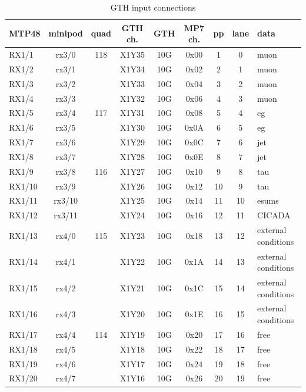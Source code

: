 \begin{longtable}{|l|c|c|c|c|c|c|c|l|}
\caption{GTH input connections}
    \label{tab:app:gth_i_conn}\\
\hline
\textbf{MTP48}& \textbf{minipod}& \textbf{quad}& \textbf{GTH ch.}& \textbf{GTH}& \textbf{MP7 ch.} &\textbf{pp}& \textbf{lane}& \textbf{data}\\
\hline
\hline
\endhead
RX1/1  & rx3/0  & 118 & X1Y35 & 10G & 0x00 & 1  & 0  & muon\\\hline
RX1/2  & rx3/1  &     & X1Y34 & 10G & 0x02 & 2  & 1  & muon\\\hline
RX1/3  & rx3/2  &     & X1Y33 & 10G & 0x04 & 3  & 2  & muon\\\hline
RX1/4  & rx3/3  &     & X1Y32 & 10G & 0x06 & 4  & 3  & muon\\\hline
RX1/5  & rx3/4  & 117 & X1Y31 & 10G & 0x08 & 5  & 4  & eg\\\hline
RX1/6  & rx3/5  &     & X1Y30 & 10G & 0x0A & 6  & 5  & eg\\\hline
RX1/7  & rx3/6  &     & X1Y29 & 10G & 0x0C & 7  & 6  & jet\\\hline
RX1/8  & rx3/7  &     & X1Y28 & 10G & 0x0E & 8  & 7  & jet\\\hline
RX1/9  & rx3/8  & 116 & X1Y27 & 10G & 0x10 & 9  & 8  & tau\\\hline
RX1/10 & rx3/9  &     & X1Y26 & 10G & 0x12 & 10 & 9  & tau\\\hline
RX1/11 & rx3/10 &     & X1Y25 & 10G & 0x14 & 11 & 10 & esums\\\hline
RX1/12 & rx3/11 &     & X1Y24 & 10G & 0x16 & 12 & 11 & CICADA\\\hline
RX1/13 & rx4/0  & 115 & X1Y23 & 10G & 0x18 & 13 & 12 & external conditions\\\hline
RX1/14 & rx4/1  &     & X1Y22 & 10G & 0x1A & 14 & 13 & external conditions\\\hline
RX1/15 & rx4/2  &     & X1Y21 & 10G & 0x1C & 15 & 14 & external conditions\\\hline
RX1/16 & rx4/3  &     & X1Y20 & 10G & 0x1E & 16 & 15 & external conditions\\\hline
RX1/17 & rx4/4  & 114 & X1Y19 & 10G & 0x20 & 17 & 16 & free\\\hline
RX1/18 & rx4/5  &     & X1Y18 & 10G & 0x22 & 18 & 17 & free\\\hline
RX1/19 & rx4/6  &     & X1Y17 & 10G & 0x24 & 19 & 18 & free\\\hline
RX1/20 & rx4/7  &     & X1Y16 & 10G & 0x26 & 20 & 19 & free\\\hline

\end{longtable}
